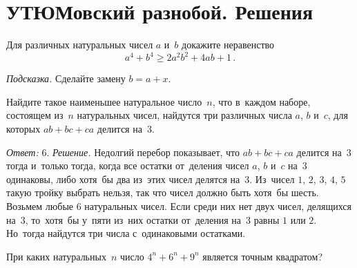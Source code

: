 
\section*{УТЮМовский разнобой. Решения}


\begin{problems}

Для различных натуральных чисел $a$ и~$b$ докажите неравенство\enspace
\[
    a^4 + b^4
\geq
    2 a^2 b^2 + 4 a b + 1
\, . \]

 \textit{Подсказка.} Сделайте замену $b = a + x$.

Найдите такое наименьшее натуральное число~$n$, что в~каждом наборе, состоящем
из~$n$ натуральных чисел, найдутся три различных числа $a$, $b$ и~$c$, для
которых $a b + b c + c a$ делится на~3.

 \textit{Ответ:} $6$.
 \textit{Решение.}
 Недолгий перебор показывает, что $a b + b c + c a$ делится на~$3$ тогда
 и~только тогда, когда все остатки от~деления чисел $a$, $b$ и~$c$ на~$3$
 одинаковы, либо хотя~бы два из~этих чисел делятся на~$3$.
 Из~чисел $1$, $2$, $3$, $4$, $5$ такую тройку выбрать нельзя, так что чисел
 должно быть хотя~бы шесть.
 Возьмем любые 6 натуральных чисел.
 Если среди них нет двух чисел, делящихся на~$3$, то~хотя~бы у~пяти из~них
 остатки от~деления на~$3$ равны $1$ или $2$.
 Но~тогда найдутся три числа с~одинаковыми остатками.

При каких натуральных~$n$ число $4^{n} + 6^{n} + 9^{n}$ является точным
квадратом?


\end{problems}
